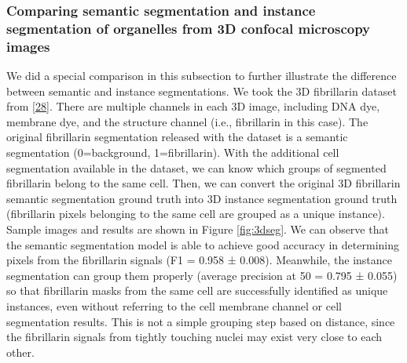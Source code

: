 \hypertarget{comparing-semantic-segmentation-and-instance-segmentation-of-organelles-from-3d-confocal-microscopy-images}{%
\subsubsection{Comparing semantic segmentation and instance segmentation of organelles from 3D confocal microscopy images}\label{comparing-semantic-segmentation-and-instance-segmentation-of-organelles-from-3d-confocal-microscopy-images}}

We did a special comparison in this subsection to further illustrate the difference between semantic and instance segmentations. We took the 3D fibrillarin dataset from {[}\protect\hyperlink{ref-5sGcmDuy}{28}{]}. There are multiple channels in each 3D image, including DNA dye, membrane dye, and the structure channel (i.e., fibrillarin in this case). The original fibrillarin segmentation released with the dataset is a semantic segmentation (0=background, 1=fibrillarin). With the additional cell segmentation available in the dataset, we can know which groups of segmented fibrillarin belong to the same cell. Then, we can convert the original 3D fibrillarin semantic segmentation ground truth into 3D instance segmentation ground truth (fibrillarin pixels belonging to the same cell are grouped as a unique instance). Sample images and results are shown in Figure \ref{fig:3dseg}. We can observe that the semantic segmentation model is able to achieve good accuracy in determining pixels from the fibrillarin signals (F1 = 0.958 ± 0.008). Meanwhile, the instance segmentation can group them properly (average precision at 50 = 0.795 ± 0.055) so that fibrillarin masks from the same cell are successfully identified as unique instances, even without referring to the cell membrane channel or cell segmentation results. This is not a simple grouping step based on distance, since the fibrillarin signals from tightly touching nuclei may exist very close to each other.

